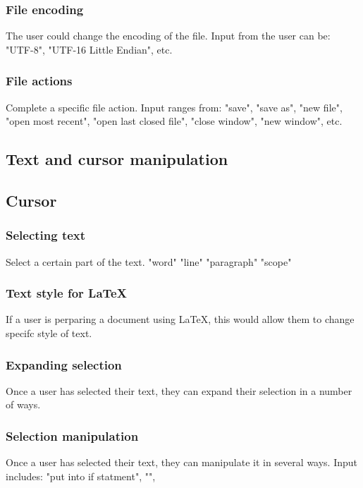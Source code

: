 \documentclass[11pt, oneside]{article}
\begin{document}
	\subsubsection{File encoding}
	 The user could change the encoding of the file. Input from the user can be: "UTF-8", "UTF-16 Little Endian", etc.


	\subsubsection{File actions}
	 Complete a specific file action. Input ranges from: "save", "save as", "new file", "open most recent", "open last closed file", "close window", "new window", etc.



\subsection{Text and cursor manipulation}

	\subsection{Cursor}

	\subsubsection{Selecting text}
	 Select a certain part of the text. "word" "line" "paragraph" "scope"

	\subsubsection{Text style for \LaTeX}
	 If a user is perparing a document using \LaTeX, this would allow them to change specifc style of text.

	\subsubsection{Expanding selection}
	 Once a user has selected their text, they can expand their selection in a number of ways.

	\subsubsection{Selection manipulation}
	 Once a user has selected their text, they can manipulate it in several ways. Input includes: "put into if statment", "",  
\end{document}
